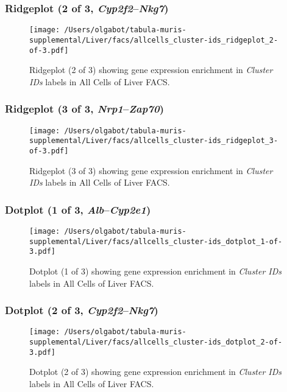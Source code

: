 \clearpage

\subsubsection{Ridgeplot (2 of 3, \emph{Cyp2f2}--\emph{Nkg7})}
\begin{figure}[h]
\centering
\texttt{[image: /Users/olgabot/tabula-muris-supplemental/Liver/facs/allcells\_cluster-ids\_ridgeplot\_2-of-3.pdf]}

\caption{ Ridgeplot (2 of 3)  showing gene expression enrichment in \emph{Cluster IDs} labels in All Cells of Liver FACS. }
\end{figure}


\clearpage

\subsubsection{Ridgeplot (3 of 3, \emph{Nrp1}--\emph{Zap70})}
\begin{figure}[h]
\centering
\texttt{[image: /Users/olgabot/tabula-muris-supplemental/Liver/facs/allcells\_cluster-ids\_ridgeplot\_3-of-3.pdf]}

\caption{ Ridgeplot (3 of 3)  showing gene expression enrichment in \emph{Cluster IDs} labels in All Cells of Liver FACS. }
\end{figure}


\clearpage

\subsubsection{Dotplot (1 of 3, \emph{Alb}--\emph{Cyp2e1})}
\begin{figure}[h]
\centering
\texttt{[image: /Users/olgabot/tabula-muris-supplemental/Liver/facs/allcells\_cluster-ids\_dotplot\_1-of-3.pdf]}

\caption{ Dotplot (1 of 3)  showing gene expression enrichment in \emph{Cluster IDs} labels in All Cells of Liver FACS. }
\end{figure}


\clearpage

\subsubsection{Dotplot (2 of 3, \emph{Cyp2f2}--\emph{Nkg7})}
\begin{figure}[h]
\centering
\texttt{[image: /Users/olgabot/tabula-muris-supplemental/Liver/facs/allcells\_cluster-ids\_dotplot\_2-of-3.pdf]}

\caption{ Dotplot (2 of 3)  showing gene expression enrichment in \emph{Cluster IDs} labels in All Cells of Liver FACS. }
\end{figure}


